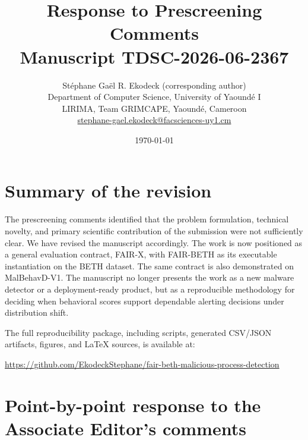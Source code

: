 \documentclass[11pt]{article}
\title{Response to Prescreening Comments\\Manuscript TDSC-2026-06-2367}
\author{%
  St\'{e}phane Ga\"{e}l R. Ekodeck (corresponding author)\\
  Department of Computer Science, University of Yaound\'{e} I\\
  LIRIMA, Team GRIMCAPE, Yaound\'{e}, Cameroon\\
  \href{mailto:stephane-gael.ekodeck@facsciences-uy1.cm}{stephane-gael.ekodeck@facsciences-uy1.cm}
}
\date{\today}
\begin{document}
\maketitle

\section*{Summary of the revision}

The prescreening comments identified that the problem formulation, technical novelty, and primary scientific contribution of the submission were not sufficiently clear. We have revised the manuscript accordingly. The work is now positioned as a general evaluation contract, FAIR-X, with FAIR-BETH as its executable instantiation on the BETH dataset. The same contract is also demonstrated on MalBehavD-V1. The manuscript no longer presents the work as a new malware detector or a deployment-ready product, but as a reproducible methodology for deciding when behavioral scores support dependable alerting decisions under distribution shift.

The full reproducibility package, including scripts, generated CSV/JSON artifacts, figures, and LaTeX sources, is available at:

\begin{center}
\url{https://github.com/EkodeckStephane/fair-beth-malicious-process-detection}
\end{center}

\section*{Point-by-point response to the Associate Editor's comments}
\end{document}

